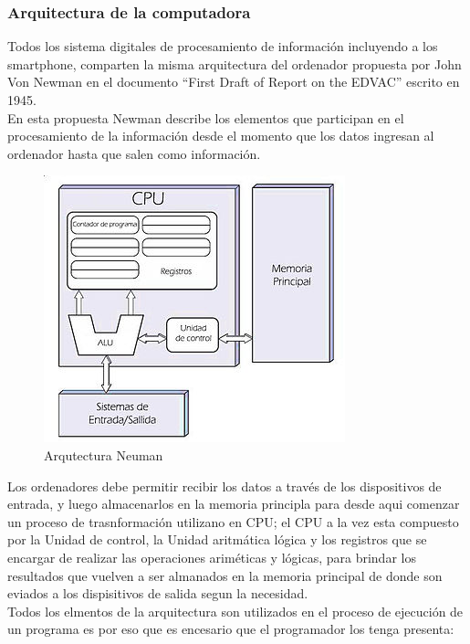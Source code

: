 \documentclass[a4paper,12pt,spanish]{article}
\begin{document}
\newpage
\restoregeometry


\subsubsection{Arquitectura de la computadora}
\label{sec:arquitectura}

Todos los sistema digitales de procesamiento de información incluyendo a los smartphone, comparten la misma arquitectura del ordenador propuesta por John Von Newman en el documento ``First Draft of Report on the EDVAC'' escrito en 1945.\\

En esta propuesta Newman describe los elementos que participan en el procesamiento de la información desde el momento que los datos  ingresan al ordenador hasta que salen como información. 



\begin{figure}[H]
  \centering
  \includegraphics[scale=0.7]{Arquitecturaneumann}
  \caption{Arqutectura Neuman}
  \label{fig:arquitectura}
\end{figure}

Los ordenadores debe permitir recibir los datos a través de los dispositivos de entrada, y luego almacenarlos en la memoria principla para desde aqui comenzar un proceso de trasnformación utilizano en CPU; el CPU a la vez esta compuesto por la Unidad de control, la Unidad aritmática lógica y los registros que se encargar de realizar las operaciones ariméticas y lógicas, para brindar los resultados que vuelven a ser almanados en la memoria principal de donde son eviados a los dispisitivos de salida segun la necesidad.\\

Todos los elmentos de la arquitectura son utilizados en el proceso de ejecución de un programa es por eso que es encesario que el programador los tenga presenta:
\end{document}
